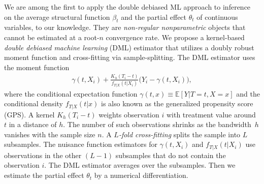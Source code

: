 \documentclass[lettersize, 12pt]{article}
\begin{document}
We are among the first to apply the double debiased ML approach to inference on 
the average structural function $\beta_t$ and the partial effect $\theta_t$ of continuous variables, to our knowledge.
They are {\it non-regular nonparametric} objects that cannot be estimated at a root-$n$ convergence rate.
We propose a kernel-based {\it double debiased machine learning} (DML) estimator 
that utilizes a doubly robust moment function and cross-fitting via sample-splitting.
The DML estimator uses the moment function
\begin{align}
\gamma(t, X_i) + \frac{K_h(T_i - t)}{ f_{T|X}(t|X_i)} \big( Y_i - \gamma(t, X_i)\big),
\label{EDR}
\end{align}
where 
the conditional expectation function $\gamma(t, x) \equiv \mathbb{E}[Y|T=t, X=x]$
and 
the conditional density $f_{T|X}(t|x)$ is also known as the generalized propensity score (GPS).
A kernel $K_h(T_i-t)$ weights observation $i$ with treatment value around $t$ in a distance of $h$. 
The number of such observations shrinks as the bandwidth~$h$ vanishes with the sample size $n$.
A {\it $L$-fold cross-fitting} splits the sample into $L$ subsamples.
 The nuisance function estimators for $\gamma(t, X_i)$ and $f_{T|X}(t|X_i)$ use observations in the other $(L-1)$ subsamples that do not contain the observation $i$.
The DML estimator averages over the subsamples.
Then we estimate the partial effect $\theta_t$ by a numerical differentiation.%
\end{document}
